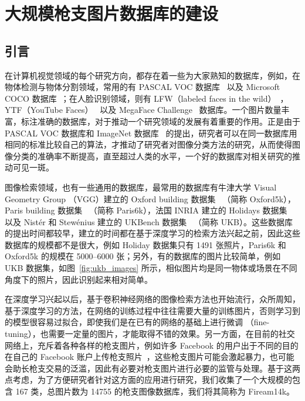 
\chapter{大规模枪支图片数据库的建设}\label{chapter:firearm_dataset}
\section{引言}
在计算机视觉领域的每个研究方向，都存在着一些为大家熟知的数据库，例如，在物体检测与物体分割领域，常用的有 PASCAL VOC 数据库~\cite{Everingham2014ThePV}  以及 Microsoft COCO 数据库~\cite{Lin2014MicrosoftCC}；在人脸识别领域，则有 LFW（labeled faces in the wild）~\cite{LFWTech}，YTF（YouTube Faces）~\cite{Wolf2011FaceRI} 以及 MegaFace Challenge~\cite{kemelmacher2016megaface}  数据库。一个图片数量丰富，标注准确的数据库，对于推动一个研究领域的发展有着重要的作用。正是由于 PASCAL VOC 数据库和 ImageNet 数据库~\cite{Russakovsky2015ImageNetLS} 的提出，研究者可以在同一数据库用相同的标准比较自己的算法，才推动了研究者对图像分类方法的研究，从而使得图像分类的准确率不断提高，直至超过人类的水平，一个好的数据库对相关研究的推动可见一斑。

图像检索领域，也有一些通用的数据库，最常用的数据库有牛津大学 Visual Geometry Group （VGG）建立的 Oxford building 数据集~\cite{Philbin2007ObjectRW} （简称 Oxford5k），Paris building 数据集~\cite{Philbin2008LostIQ} （简称 Paris6k），法国 INRIA 建立的 Holidays 数据集~\cite{Jgou2008HammingEA} 以及 Nist{\'e}r 和 Stew{\'e}nius 建立的 UKBench 数据集~\cite{Nistr2006ScalableRW} （简称 UKB）。这些数据库的提出时间都较早，建立的时间都在基于深度学习的检索方法兴起之前，因此这些数据库的规模都不是很大，例如 Holiday 数据集只有 1491 张照片，Paris6k 和 Oxford5k 的规模在 5000--6000 张；另外，有的数据库的图片比较简单，例如 UKB 数据集，如图~\ref{fig:ukb_images} 所示，相似图片均是同一物体或场景在不同角度下的照片，因此识别起来相对简单。

在深度学习兴起以后，基于卷积神经网络的图像检索方法也开始流行，众所周知，基于深度学习的方法，在网络的训练过程中往往需要大量的训练图片，否则学习到的模型很容易过拟合，即使我们是在已有的网络的基础上进行微调 （fine-tuning），也需要一定量的图片，才能取得不错的效果。另一方面，在目前的社交网络上，充斥着各种各样的枪支图片，例如许多 Facebook 的用户出于不同的目的在自己的 Facebook 账户上传枪支照片~\cite{Drange2016}，这些枪支图片可能会激起暴力，也可能会助长枪支交易的泛滥，因此有必要对枪支图片进行必要的监管与处理。基于这两点考虑，为了方便研究者针对这方面的应用进行研究，我们收集了一个大规模的包含 167 类，总图片数为 14755 的枪支图像数据库，我们将其简称为 Fiream14k。

